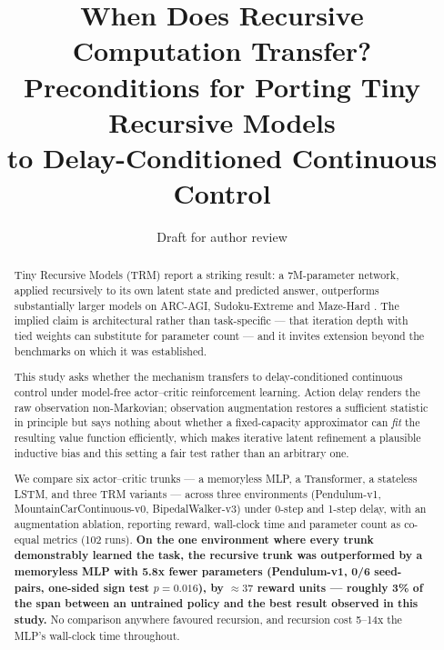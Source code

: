 \documentclass[11pt]{article}
\title{When Does Recursive Computation Transfer?\\
Preconditions for Porting Tiny Recursive Models\\
to Delay-Conditioned Continuous Control}
\author{}
\date{Draft for author review}
\begin{document}
\maketitle

\begin{abstract}
Tiny Recursive Models (TRM) report a striking result: a 7M-parameter network, applied recursively to its own latent state and predicted answer, outperforms substantially larger models on ARC-AGI, Sudoku-Extreme and Maze-Hard \citep{jolicoeurmartineau2025trm}. The implied claim is architectural rather than task-specific --- that iteration depth with tied weights can substitute for parameter count --- and it invites extension beyond the benchmarks on which it was established.

This study asks whether the mechanism transfers to delay-conditioned continuous control under model-free actor--critic reinforcement learning. Action delay renders the raw observation non-Markovian; observation augmentation restores a sufficient statistic in principle \citep{katsikopoulos2003delayed} but says nothing about whether a fixed-capacity approximator can \emph{fit} the resulting value function efficiently, which makes iterative latent refinement a plausible inductive bias and this setting a fair test rather than an arbitrary one.

We compare six actor--critic trunks --- a memoryless MLP, a Transformer, a stateless LSTM, and three TRM variants --- across three environments (Pendulum-v1, MountainCarContinuous-v0, BipedalWalker-v3) under 0-step and 1-step delay, with an augmentation ablation, reporting reward, wall-clock time and parameter count as co-equal metrics (102 runs). \textbf{On the one environment where every trunk demonstrably learned the task, the recursive trunk was outperformed by a memoryless MLP with 5.8x fewer parameters (Pendulum-v1, 0/6 seed-pairs, one-sided sign test $p=0.016$), by ${\approx}37$ reward units --- roughly 3\% of the span between an untrained policy and the best result observed in this study.} No comparison anywhere favoured recursion, and recursion cost 5--14x the MLP's wall-clock time throughout.


\end{abstract}
\end{document}
